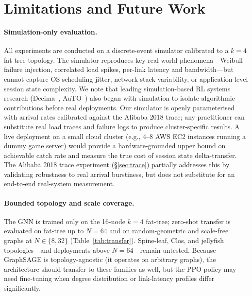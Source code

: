 \documentclass[review,1p]{elsarticle}
\theoremstyle{definition}
\begin{document}
\section{Limitations and Future Work}
\label{sec:limitations}

\paragraph{Simulation-only evaluation.}
\begin{sloppypar}
All experiments are conducted on a discrete-event simulator calibrated
to a $k{=}4$ fat-tree topology.  The simulator reproduces key
real-world phenomena---Weibull failure injection, correlated load
spikes, per-link latency and bandwidth---but cannot capture
OS scheduling jitter, network stack variability, or application-level
session state complexity.  We note that leading simulation-based RL
systems research (Decima~\cite{sigcomm19decima}, AuTO~\cite{auto2018})
also began with simulation to isolate algorithmic contributions
before real deployments.  Our simulator is openly parameterised with
arrival rates calibrated against the Alibaba 2018 trace;
any practitioner can substitute real load traces and failure logs to
produce cluster-specific results.  A live deployment on a small cloud
cluster (e.g., 4--8 AWS EC2 instances running a dummy game server) would
provide a hardware-grounded upper bound on achievable catch rate and
measure the true cost of session state delta-transfer.
The Alibaba 2018 trace experiment (\S\ref{sec:trace}) partially
addresses this by validating robustness to real arrival burstiness,
but does not substitute for an end-to-end real-system measurement.
\end{sloppypar}

\paragraph{Bounded topology and scale coverage.}
The GNN is trained only on the 16-node $k{=}4$ fat-tree; zero-shot
transfer is evaluated on fat-tree up to $N{=}64$ and on
random-geometric and scale-free graphs at $N{\in}\{8,32\}$
(Table~\ref{tab:transfer}).  Spine-leaf, Clos, and jellyfish
topologies---and deployments above $N{=}64$---remain untested.
Because GraphSAGE is topology-agnostic (it operates on
arbitrary graphs), the architecture should transfer to these
families as well, but the PPO policy may need fine-tuning when
degree distribution or link-latency profiles differ significantly.
\end{document}
